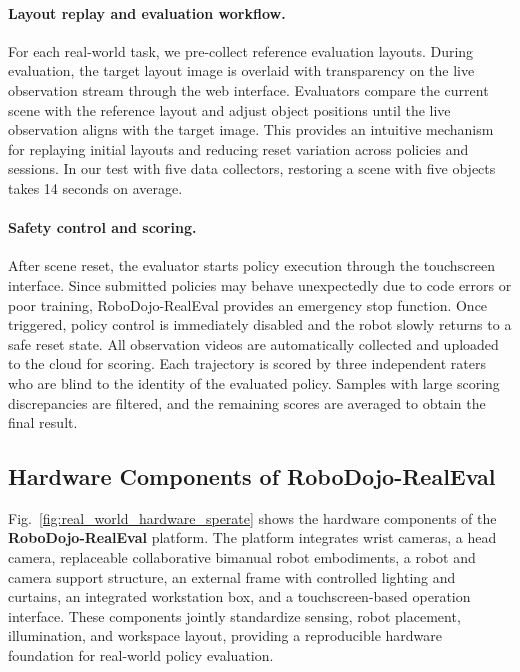 \paragraph{Layout replay and evaluation workflow.}
For each real-world task, we pre-collect reference evaluation layouts. During evaluation, the target layout image is overlaid with transparency on the live observation stream through the web interface. Evaluators compare the current scene with the reference layout and adjust object positions until the live observation aligns with the target image. This provides an intuitive mechanism for replaying initial layouts and reducing reset variation across policies and sessions. In our test with five data collectors, restoring a scene with five objects takes 14 seconds on average.

\paragraph{Safety control and scoring.}
After scene reset, the evaluator starts policy execution through the touchscreen interface. Since submitted policies may behave unexpectedly due to code errors or poor training, RoboDojo-RealEval provides an emergency stop function. Once triggered, policy control is immediately disabled and the robot slowly returns to a safe reset state. All observation videos are automatically collected and uploaded to the cloud for scoring. Each trajectory is scored by three independent raters who are blind to the identity of the evaluated policy. Samples with large scoring discrepancies are filtered, and the remaining scores are averaged to obtain the final result.

\subsection{Hardware Components of RoboDojo-RealEval}
\label{appendix:realeval_hardware_components}

Fig.~\ref{fig:real_world_hardware_sperate} shows the hardware components of the \textbf{RoboDojo-RealEval} platform. The platform integrates wrist cameras, a head camera, replaceable collaborative bimanual robot embodiments, a robot and camera support structure, an external frame with controlled lighting and curtains, an integrated workstation box, and a touchscreen-based operation interface. These components jointly standardize sensing, robot placement, illumination, and workspace layout, providing a reproducible hardware foundation for real-world policy evaluation.

